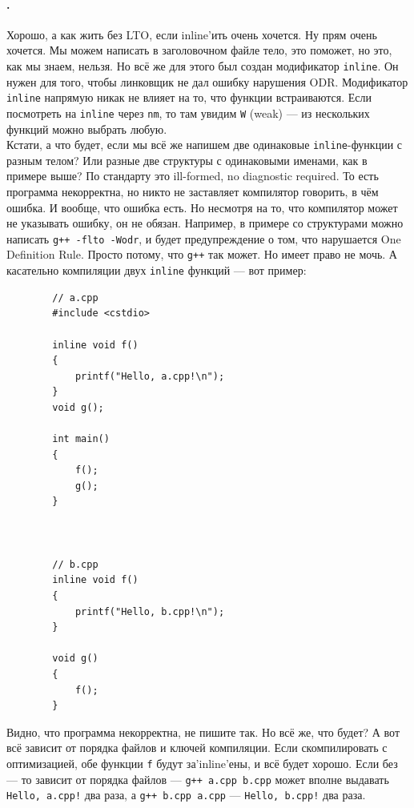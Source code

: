 \documentclass{article}
\begin{document}
    \paragraph{.}
    Хорошо, а как жить без LTO, если inline'ить очень хочется. Ну прям очень хочется. Мы можем написать в заголовочном файле тело, это поможет, но это, как мы знаем, нельзя. Но всё же для этого был создан модификатор \texttt{inline}. Он нужен для того, чтобы линковщик не дал ошибку нарушения ODR. Модификатор \texttt{inline} напрямую никак не влияет на то, что функции встраиваются. Если посмотреть на \texttt{inline} через \texttt{nm}, то там увидим \texttt{W} (weak) --- из нескольких функций можно выбрать любую.\\
    Кстати, а что будет, если мы всё же напишем две одинаковые \texttt{inline}-функции с разным телом? Или разные две структуры с одинаковыми именами, как в примере выше? По стандарту это ill-formed, no diagnostic required. То есть программа некорректна, но никто не заставляет компилятор говорить, в чём ошибка. И вообще, что ошибка есть. Но несмотря на то, что компилятор может не указывать ошибку, он не обязан. Например, в примере со структурами можно написать \texttt{g++ -flto -Wodr}, и будет предупреждение о том, что нарушается One Definition Rule. Просто потому, что \texttt{g++} так может. Но имеет право не мочь. А касательно компиляции двух \texttt{inline} функций --- вот пример:
    \begin{verbatim}
        // a.cpp
        #include <cstdio>

        inline void f()
        {
            printf("Hello, a.cpp!\n");
        }
        void g();

        int main()
        {
            f();
            g();
        }



        // b.cpp
        inline void f()
        {
            printf("Hello, b.cpp!\n");
        }

        void g()
        {
            f();
        }
    \end{verbatim}
    Видно, что программа некорректна, не пишите так. Но всё же, что будет? А вот всё зависит от порядка файлов и ключей компиляции. Если скомпилировать с оптимизацией, обе функции \texttt{f} будут за'inline'ены, и всё будет хорошо. Если без --- то зависит от порядка файлов --- \texttt{g++ a.cpp b.cpp} может вполне выдавать \texttt{Hello, a.cpp!} два раза, а \texttt{g++ b.cpp a.cpp} --- \texttt{Hello, b.cpp!} два раза.
\end{document}
